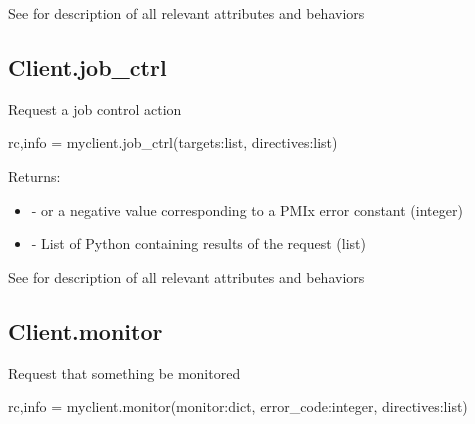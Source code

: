 See  for description of all relevant attributes and behaviors


\subsection{Client.job_ctrl}

\summary

Request a job control action

\format

\pyspecificstart
\begin{codepar}
rc,info = myclient.job_ctrl(targets:list, directives:list)
\end{codepar}
\pyspecificend

\begin{arglist}
\end{arglist}

Returns:

\begin{itemize}
    \item {} -  or a negative value corresponding to a PMIx error constant (integer)
    \item {} - List of Python  containing results of the request (list)
\end{itemize}


See  for description of all relevant attributes and behaviors


\subsection{Client.monitor}

\summary

Request that something be monitored

\format

\pyspecificstart
\begin{codepar}
rc,info = myclient.monitor(monitor:dict, error_code:integer, directives:list)
\end{codepar}
\pyspecificend

